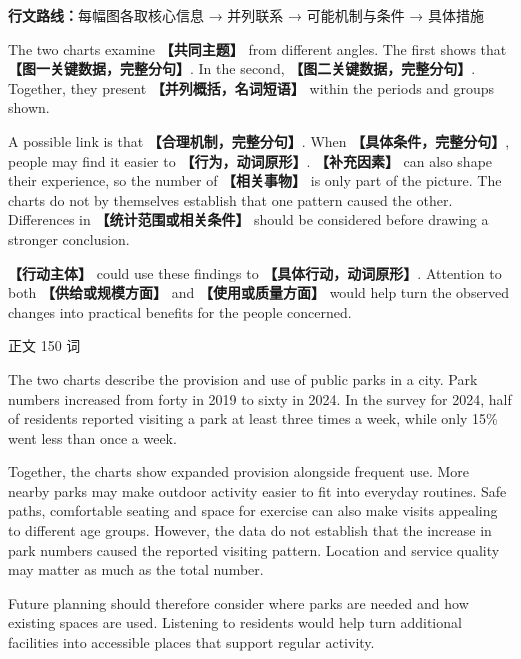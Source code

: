 \documentclass[11pt,a4paper,fontset=macnew]{ctexart}
\newenvironment{writing}{\begingroup\fontsize{10.5}{13.5}\selectfont\setlength{\parskip}{3pt}}{\par\endgroup}
\newenvironment{example}{\begingroup\fontsize{11}{14.3}\selectfont\setlength{\parskip}{4pt}}{\par\endgroup}
\begin{document}
{\small\textbf{行文路线：}每幅图各取核心信息 → 并列联系 → 可能机制与条件 → 具体措施}\par
\par\vspace{4pt}{\bfseries 可替换模板}\par\nopagebreak
\begin{writing}
The two charts examine {\bfseries 【共同主题】} from different angles. The first shows that {\bfseries 【图一关键数据，完整分句】}. In the second, {\bfseries 【图二关键数据，完整分句】}. Together, they present {\bfseries 【并列概括，名词短语】} within the periods and groups shown.

A possible link is that {\bfseries 【合理机制，完整分句】}. When {\bfseries 【具体条件，完整分句】}, people may find it easier to {\bfseries 【行为，动词原形】}. {\bfseries 【补充因素】} can also shape their experience, so the number of {\bfseries 【相关事物】} is only part of the picture. The charts do not by themselves establish that one pattern caused the other. Differences in {\bfseries 【统计范围或相关条件】} should be considered before drawing a stronger conclusion.

{\bfseries 【行动主体】} could use these findings to {\bfseries 【具体行动，动词原形】}. Attention to both {\bfseries 【供给或规模方面】} and {\bfseries 【使用或质量方面】} would help turn the observed changes into practical benefits for the people concerned.

\end{writing}
\par\vspace{4pt}{\bfseries 完整套用示例}\par\nopagebreak
{\small 正文 150 词}\par
\begin{example}
The two charts describe the provision and use of public parks in a city. Park numbers increased from forty in 2019 to sixty in 2024. In the survey for 2024, half of residents reported visiting a park at least three times a week, while only 15\% went less than once a week.

Together, the charts show expanded provision alongside frequent use. More nearby parks may make outdoor activity easier to fit into everyday routines. Safe paths, comfortable seating and space for exercise can also make visits appealing to different age groups. However, the data do not establish that the increase in park numbers caused the reported visiting pattern. Location and service quality may matter as much as the total number.

Future planning should therefore consider where parks are needed and how existing spaces are used. Listening to residents would help turn additional facilities into accessible places that support regular activity.

\end{example}
\end{document}
